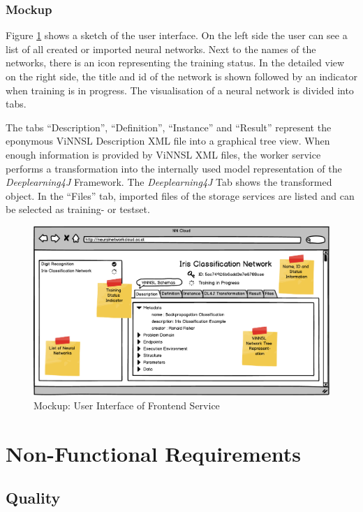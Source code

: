 \subsubsection{Mockup}\label{mockup}

Figure \ref{vinnsl-ui-mockup} shows a sketch of the user interface. On
the left side the user can see a list of all created or imported neural
networks. Next to the names of the networks, there is an icon
representing the training status. In the detailed view on the right
side, the title and id of the network is shown followed by an indicator
when training is in progress. The visualisation of a neural network is
divided into tabs.

The tabs ``Description'', ``Definition'', ``Instance'' and ``Result''
represent the eponymous ViNNSL Description XML file into a graphical
tree view. When enough information is provided by ViNNSL XML files, the
worker service performs a transformation into the internally used model
representation of the \emph{Deeplearning4J} Framework. The
\emph{Deeplearning4J} Tab shows the transformed object. In the ``Files''
tab, imported files of the storage services are listed and can be
selected as training- or testset.

\begin{figure}
\centering
\includegraphics[width=17.00000cm]{./images/vinnsl-ui-mockup}
\caption{Mockup: User Interface of Frontend
Service\label{vinnsl-ui-mockup}}
\end{figure}

\section{Non-Functional Requirements}\label{non-functional-requirements}

\subsection{Quality}\label{quality}

